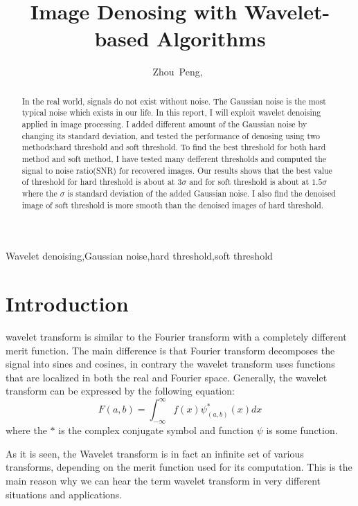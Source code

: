 \documentclass[journal,comsoc]{IEEEtran}
\begin{document}
\title{Image Denosing with Wavelet-based Algorithms}
\author{Zhou~Peng,~}
\maketitle

\begin{abstract}
  In the real world, signals do not exist without noise. The Gaussian noise
  is the most typical noise which exists in our life. In this report, I will
  exploit wavelet denoising applied in image processing. I added different
  amount of the Gaussian noise by changing its standard deviation, and tested
  the performance of denosing using two methods:hard threshold and soft threshold.
  To find the best threshold for both hard method and soft method, I have tested
  many defferent thresholds and computed the signal to noise ratio(SNR) for recovered
  images. Our results shows that the best value of threshold for hard threshold is about
  at $3\sigma$ and for soft threshold is about at $1.5\sigma$ where the $\sigma$ is
  standard deviation of the added Gaussian noise. I also find the denoised image
  of soft threshold is more smooth than the denoised images of hard threshold.
\end{abstract}

\begin{IEEEkeywords}
Wavelet denoising,Gaussian noise,hard threshold,soft threshold
\end{IEEEkeywords}

\section{Introduction}

 wavelet transform is similar to the Fourier transform with a completely different merit function.
The main difference is that Fourier transform decomposes the signal into sines and cosines, in contrary
the wavelet transform uses functions that are localized in both the real and Fourier space.
Generally, the wavelet transform can be expressed by the following equation:
\begin{equation}
  F(a,b)=\int_{-\infty}^{\infty}f(x)\psi_{(a,b)}^*(x)dx
\end{equation}
where the $*$ is the complex conjugate symbol and function $\psi$ is some function. 

As it is seen, the Wavelet transform is in fact an infinite set of various transforms, depending on the
merit function used for its computation. This is the main reason why we can hear the term wavelet transform
in very different situations and applications. 
\end{document}
